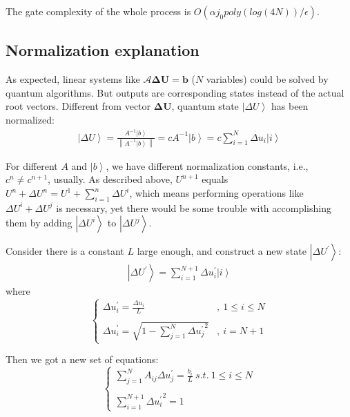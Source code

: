 \documentclass[%
 reprint,
 amsmath,amssymb,
pra,
]{revtex4-1}
\begin{document}
\begin{itemize}
The gate complexity of the whole process is $O(\alpha j_0poly(log(4N))/\epsilon)$.





\subsection{Normalization explanation}
As expected, linear systems like $\mathcal{A} \bm{\Delta U} = \bm{b}$ ($N$ variables) could be solved by quantum algorithms. But outputs are corresponding states instead of the actual root vectors. Different from vector $\bm{\Delta U}$, quantum state $\left| \Delta U\right\rangle$ has been normalized: 
\begin{align}
	\left| \Delta U\right\rangle = \frac{A^{-1} \left|b\right\rangle}{\left\|A^{-1} \left|b\right\rangle\right\|} = c A^{-1} \left|b\right\rangle = c \sum_{i=1}^{N} \Delta u_i\left|i\right\rangle
\end{align}

For different $A$ and $\left|b\right\rangle$, we have different normalization constants, i.e., $c^{n} \neq c^{n+1}$, usually. As described above, $U^{n+1}$ equals $U^{n} + \Delta U^{n} = U^{1} + \sum_{i=1}^{n} \Delta U^{i}$, which means performing operations like $\Delta U^{i} + \Delta U^{j}$ is necessary, yet there would be some trouble with accomplishing them by adding $\left|\Delta U^{i}\right\rangle$ to $\left|\Delta U^{j}\right\rangle$.

Consider there is a constant $L$ large enough, and construct a new state $\left|\Delta U^{\prime}\right\rangle$: 
\begin{align}
	\left|\Delta U^{\prime}\right\rangle = \sum_{i=1}^{N+1}\Delta  u_i^{\prime}\left|i\right\rangle
\end{align}
where
\begin{equation}
	\left\{
	\begin{array}{ll}
		\Delta u_i^{\prime} = \frac{\Delta u_i}{L}&,\ 1\leq i \leq N\\
		&\\
		\Delta u_i^{\prime} = \sqrt{1 - \sum_{j=1}^{N}{\Delta u_j^{\prime}}^2}&,\ i=N+1
	\end{array}
	\right.
\end{equation}

Then we got a new set of equations:
\begin{equation}\label{eq:Delta_u_prime_equations}
	\left\{
	\begin{array}{l}
		\sum_{j=1}^{N}A_{ij}\Delta u_j^{\prime} = \frac{b_i}{L} \ s.t. \ 1\leq i \leq N\\
		\\
		\sum_{i=1}^{N + 1}{\Delta u_i^{\prime}}^2 = 1
	\end{array}
	\right.
\end{equation}


\end{itemize}
\end{document}
